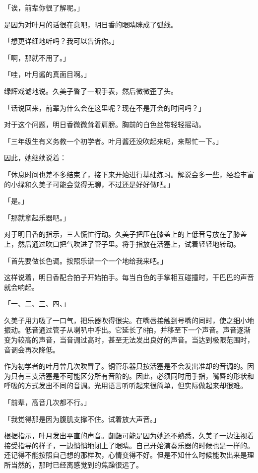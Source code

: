 \documentclass[UTF8]{ctexart}
\begin{document}
    「诶，前辈你很了解呢。」

    是因为对叶月的话很在意吧，明日香的眼睛眯成了弧线。

    「想更详细地听吗？我可以告诉你。」

    「啊，那就不用了。」

    「哇，叶月酱的真面目啊。」

    绿辉戏谑地说。久美子瞥了一眼手表，然后微微歪了头。

    「话说回来，前辈为什么会在这里呢？现在不是开会的时间吗？」

    对于这个问题，明日香微微耸着肩膀。胸前的白色丝带轻轻摇动。

    「三年级生有义务教一个初学者。叶月酱还没吹起来呢，来帮忙一下。」

    因此，她继续说着：

    「休息时间也差不多结束了，接下来开始进行基础练习。解说会多一些，经验丰富的小绿和久美子可能会觉得无聊，不过还是好好做吧。」

    「是。」

    「那就拿起乐器吧。」

    对于明日香的指示，三人慌忙行动。久美子把压在膝盖上的上低音号放在了膝盖上，然后通过吹口把气吹进了管子里。将手指放在活塞上，试着轻轻地转动。

    「首先要做长色调。按照乐谱一个一个地给我来吧。」

    这样说着，明日香配合拍子开始拍手。每当白色的手掌相互碰撞时，干巴巴的声音就会响起。

    「一、二、三、四、」

    久美子用力吸了一口气，把乐器吹得很尖。在嘴唇接触到号嘴的同时，使之细小地振动。低音通过管子从喇叭中呼出。它延长了8拍，并移至下一个声音。声音逐渐变为较高的声音，当音调过高时，甚至无法发出良好的声音。当达到极限范围时，音调会再次降低。

    作为初学者的叶月曾几次吹冒了。铜管乐器只按活塞是不会发出准却的音调的。因为只有三支活塞是不可能区分所有音阶的。因此，必须同时用手指，嘴唇的形状和呼吸的方式发出不同的音调。光用语言听听起来很简单，但实际做起来却很难。

    「前辈，高音几次都不行。」

    「我觉得那是因为腹肌支撑不住。试着放大声音。」

    根据指示，叶月发出平直的声音。龃龉可能是因为她还不熟悉，久美子一边注视着接受指导的样子，一边悄悄地闭上了眼睛。自己开始演奏乐器的时候也是一样的。还记得不能按照自己想的那样吹，心情变得不好。但是不知什么时候能吹出来是理所当然的，那时已经离感觉到的焦躁很远了。
\end{document}
